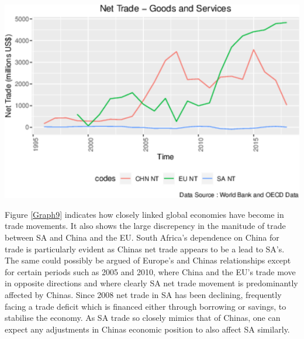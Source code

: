 \documentclass[11pt,preprint, authoryear]{elsarticle}
\let\origfigure\figure
\let\endorigfigure\endfigure
\renewenvironment{figure}[1][2] {
    \expandafter\origfigure\expandafter[H]
} {
    \endorigfigure
}
\numberwithin{equation}{section}
\numberwithin{figure}{section}
\numberwithin{table}{section}
\begin{document}
\begin{figure}[H]

{\centering \includegraphics{tradedynamics1_files/figure-latex/Graph9-1} 

}

\caption{Europe Export and Import Growth \label{Graph9}}\label{fig:Graph9}
\end{figure}

Figure \ref{Graph9} indicates how closely linked global economies have
become in trade movements. It also shows the large discrepency in the
manitude of trade between SA and China and the EU. South Africa's
dependence on China for trade is particularly evident as Chinas net
trade appears to be a lead to SA's. The same could possibly be argued of
Europe's and Chinas relationships except for certain periods such as
2005 and 2010, where China and the EU's trade move in opposite
directions and where clearly SA net trade movement is predominantly
affected by Chinas. Since 2008 net trade in SA has been declining,
frequently facing a trade deficit which is financed either through
borrowing or savings, to stabilise the economy. As SA trade so closely
mimics that of Chinas, one can expect any adjustments in Chinas economic
position to also affect SA similarly.
\end{document}
